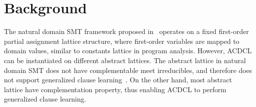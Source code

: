 \section{Background}
The natural domain SMT framework proposed in~\cite{ndsmt} operates on
a fixed first-order partial assignment lattice structure, where first-order 
variables are mapped to domain values, similar to constants lattice 
in program analysis.  However, ACDCL can be instantiated on different 
abstract lattices.  The abstract lattice in natural domain SMT does 
not have complementable meet irreducibles, and therefore does not 
support generalized clause learning~\cite{sas}.  On the other hand, 
most abstract lattice have complementation property, thus enabling 
ACDCL to perform generalized clause learning.

